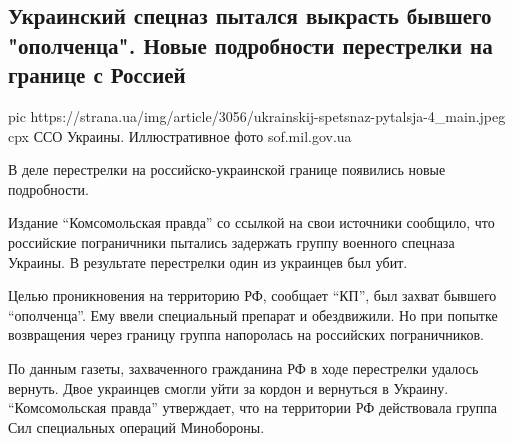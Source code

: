  
 
 
 
 
 
\subsection{Украинский спецназ пытался выкрасть бывшего "ополченца". Новые подробности перестрелки на границе с Россией}
\label{sec:09_12_2020.news.ua.strana.1.sbu_rossia_incident_granica}

\ifcmt
pic https://strana.ua/img/article/3056/ukrainskij-spetsnaz-pytalsja-4_main.jpeg
cpx ССО Украины. Иллюстративное фото sof.mil.gov.ua 
\fi

В деле перестрелки на российско-украинской границе появились новые подробности.

Издание \enquote{Комсомольская правда} со ссылкой на свои источники сообщило, что
российские пограничники пытались задержать группу военного спецназа Украины. В
результате перестрелки один из украинцев был убит. 

Целью проникновения на территорию РФ, сообщает \enquote{КП}, был захват бывшего
\enquote{ополченца}. Ему ввели специальный препарат и обездвижили. Но при попытке
возвращения через границу группа напоролась на российских пограничников. 

По данным газеты, захваченного гражданина РФ в ходе перестрелки удалось
вернуть. Двое украинцев смогли уйти за кордон и вернуться в Украину.
\enquote{Комсомольская правда} утверждает, что на территории РФ действовала группа Сил
специальных операций Минобороны. 

